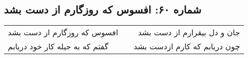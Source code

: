 \begin{center}
\section*{شماره ۶۰: افسوس که روزگارم از دست بشد}
\label{sec:060}
\begin{longtable}{l p{0.5cm} r}
افسوس که روزگارم از دست بشد
&&
جان و دل بیقرارم از دست بشد
\\
گفتم که به حیله کار خود دریابم
&&
چون دریابم که کارم ازدست بشد
\\
\end{longtable}
\end{center}
